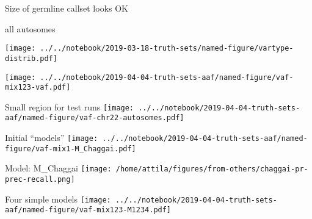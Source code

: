 \documentclass{beamer}
\begin{document}
\begin{frame}{Size of germline callset looks OK}
\begin{center}
{\large all autosomes}
\vfill

\texttt{[image: ../../notebook/2019-03-18-truth-sets/named-figure/vartype-distrib.pdf]}
\end{center}
\end{frame}


\begin{frame}[plain]
\texttt{[image: ../../notebook/2019-04-04-truth-sets-aaf/named-figure/vaf-mix123-vaf.pdf]}
\end{frame}

\begin{frame}{Small region for test runs}
\texttt{[image: ../../notebook/2019-04-04-truth-sets-aaf/named-figure/vaf-chr22-autosomes.pdf]}
\end{frame}


\begin{frame}[label=chaggais_model]{Initial ``models''}
\texttt{[image: ../../notebook/2019-04-04-truth-sets-aaf/named-figure/vaf-mix1-M\_Chaggai.pdf]}
\end{frame}

\begin{frame}{Model: M\_Chaggai}
\texttt{[image: /home/attila/figures/from-others/chaggai-pr-prec-recall.png]}
\end{frame}


\begin{frame}[plain]
Four simple models
\texttt{[image: ../../notebook/2019-04-04-truth-sets-aaf/named-figure/vaf-mix123-M1234.pdf]}
\end{frame}
\end{document}
